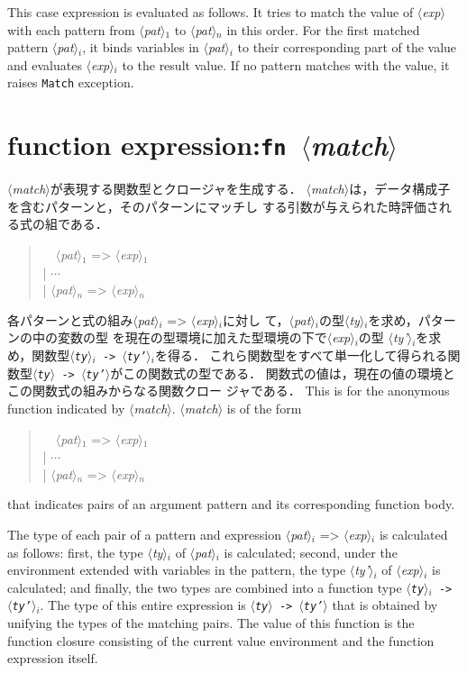 \documentclass{jbook}
\newcommand{\txt}[2]{#2}
\newcommand{\code}[1]{\mbox{\large\tt #1}}
\newcommand{\nonterm}[1]{\mbox{$\langle$}{\it #1}\mbox{$\rangle$}}
\newcommand{\term}[1]{\mbox{{\tt #1}}}
\newcommand{\myem}{\mbox{\ \ }}
\newenvironment{program}{\begin{quote}\begin{tt}}%
                        {\end{tt}\end{quote}}
\begin{document}
	This case expression is evaluated as follows.
	It tries to match the value of \nonterm{exp} with
each pattern from \nonterm{pat}$_1$ to \nonterm{pat}$_n$ in this
order.
	For the first matched pattern \nonterm{pat}$_i$,
it binds variables in \nonterm{pat}$_i$ to their corresponding part of
the value and evaluates \nonterm{exp}$_i$ to the result value.
	If no pattern matches with the value,
it raises \code{Match} exception.
\fi%


\section{\txt{関数式}{function expression}:\term{fn}\ \nonterm{match}}

\ifjp%
	\nonterm{match}が表現する関数型とクロージャを生成する．
	\nonterm{match}は，データ構成子を含むパターンと，そのパターンにマッチし
する引数が与えられた時評価される式の組である．
\begin{program}
\myem  \nonterm{pat}$_1$ => \nonterm{exp}$_1$
\\
| $\cdots$
\\
| \nonterm{pat}$_n$ => \nonterm{exp}$_n$
\end{program}
	各パターンと式の組み\nonterm{pat}$_i$ => \nonterm{exp}$_i$に対し
て，\nonterm{pat}$_i$の型\nonterm{ty}$_i$を求め，パターンの中の変数の型
を現在の型環境に加えた型環境の下で\nonterm{exp}$_i$の型
\nonterm{ty'}$_i$を求め，関数型\code{\nonterm{ty}$_i$ ->
\nonterm{ty'}$_i$}を得る．
	これら関数型をすべて単一化して得られる関数型\code{\nonterm{ty}
-> \nonterm{ty'}}がこの関数式の型である．
	関数式の値は，現在の値の環境とこの関数式の組みからなる関数クロー
ジャである．
\else%
	This is for the anonymous function indicated
 by \nonterm{match}.
	\nonterm{match} is of the form
\begin{program}
\myem  \nonterm{pat}$_1$ => \nonterm{exp}$_1$
\\
| $\cdots$
\\
| \nonterm{pat}$_n$ => \nonterm{exp}$_n$
\end{program}
that indicates pairs of an argument pattern and its corresponding
function body.

	The type of each pair of a pattern and expression
\nonterm{pat}$_i$ => \nonterm{exp}$_i$ is calculated as follows:
	first, the type \nonterm{ty}$_i$ of \nonterm{pat}$_i$ is
calculated;
	second, under the environment extended with variables in
the pattern, the type \nonterm{ty'}$_i$ of \nonterm{exp}$_i$ is
calculated;
	and finally, the two types are combined into a function type
\code{\nonterm{ty}$_i$ -> \nonterm{ty'}$_i$}.
	The type of this entire expression is
\code{\nonterm{ty} -> \nonterm{ty'}}
that is obtained by
unifying the types of the matching pairs.
	The value of this function is the function closure
consisting of the current value environment and the function
expression itself.
\fi%
\end{document}
